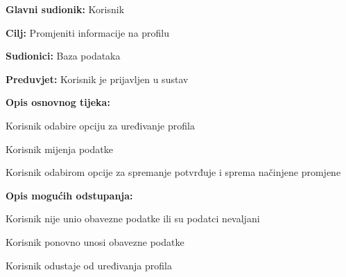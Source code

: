     	\noindent {}
    	\begin{packed_item}
    		
    		\item \textbf{Glavni sudionik: }
    		Korisnik 
    		\item  \textbf{Cilj:} Promjeniti informacije na profilu
    		\item  \textbf{Sudionici:} Baza podataka
    		\item  \textbf{Preduvjet:} Korisnik je prijavljen u sustav
    		\item  \textbf{Opis osnovnog tijeka:}
    		
    		\item[] \begin{packed_enum}
    			
    			\item Korisnik odabire opciju za uređivanje profila 
    			\item Korisnik mijenja podatke
    			\item Korisnik odabirom opcije za spremanje potvrđuje i sprema načinjene promjene
    		\end{packed_enum}
    		\item  \textbf{Opis mogućih odstupanja:}
    			
    			\item[] \begin{packed_item}
    				
    				\item[3.a] Korisnik nije unio obavezne podatke ili su podatci nevaljani
    				\item[] \begin{packed_enum}
    					
    					\item Korisnik ponovno unosi obavezne podatke
    					\item Korisnik odustaje od uređivanja profila
    					
    				\end{packed_enum}
    				
    			\end{packed_item}

    	\end{packed_item}
    	
